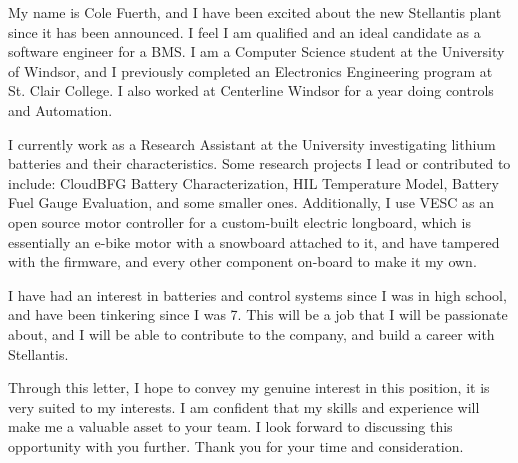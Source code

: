 My name is Cole Fuerth, and I have been excited about the new Stellantis plant since it has been announced. I feel I am qualified and an ideal candidate as a software engineer for a BMS. I am a Computer Science student at the University of Windsor, and I previously completed an Electronics Engineering program at St. Clair College. I also worked at Centerline Windsor for a year doing controls and Automation.

I currently work as a Research Assistant at the University investigating lithium batteries and their characteristics. Some research projects I lead or contributed to include: CloudBFG Battery Characterization, HIL Temperature Model, Battery Fuel Gauge Evaluation, and some smaller ones. Additionally, I use VESC as an open source motor controller for a custom-built electric longboard, which is essentially an e-bike motor with a snowboard attached to it, and have tampered with the firmware, and every other component on-board to make it my own.

I have had an interest in batteries and control systems since I was in high school, and have been tinkering since I was 7. This will be a job that I will be passionate about, and I will be able to contribute to the company, and build a career with Stellantis. 

Through this letter, I hope to convey my genuine interest in this position, it is very suited to my interests. I am confident that my skills and experience will make me a valuable asset to your team. I look forward to discussing this opportunity with you further. Thank you for your time and consideration.